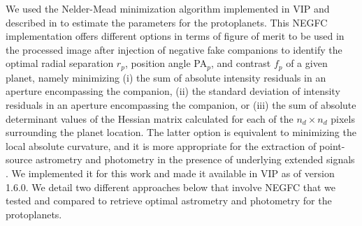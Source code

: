 \documentclass[longauth]{aa}
\begin{document}
\begin{appendix}
We used the Nelder-Mead minimization algorithm implemented in VIP and 
described in \citet{Wertz2017} to estimate the parameters for the protoplanets.
This NEGFC implementation %
offers different options in terms of figure of merit to be used in the processed image after injection of negative fake companions to identify the optimal radial separation $r_p$, position angle PA$_p$, and contrast $f_p$ of a given planet, namely minimizing (i) the sum of absolute intensity residuals in an aperture encompassing the companion, (ii) the standard deviation of intensity residuals in an aperture encompassing the companion, or (iii) the sum of absolute determinant values of the Hessian matrix calculated for each of the $n_d \times n_d$ pixels surrounding the planet location. The latter option is equivalent to minimizing the local absolute curvature, and it is more appropriate for the extraction of point-source astrometry and photometry in the presence of underlying extended signals \citep[e.g.,][]{Quanz2015}. We implemented it for this work and made it available in VIP as of version 1.6.0. %
We detail two different approaches below that involve NEGFC that we tested and compared to retrieve optimal astrometry and photometry for the protoplanets.
    

\end{appendix}
\end{document}
